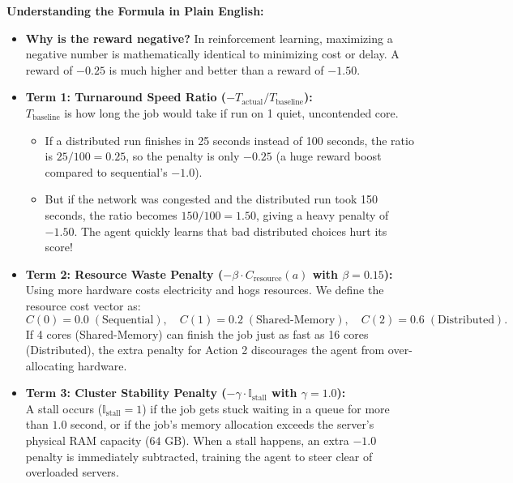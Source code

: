 \documentclass[11pt,a4paper]{article}
\begin{document}
\noindent \textbf{Understanding the Formula in Plain English:}
\begin{itemize}[noitemsep, topsep=2pt]
    \item \textbf{Why is the reward negative?} In reinforcement learning, maximizing a negative number is mathematically identical to minimizing cost or delay. A reward of $-0.25$ is much higher and better than a reward of $-1.50$.
    \item \textbf{Term 1: Turnaround Speed Ratio ($-T_{\text{actual}} / T_{\text{baseline}}$):}\\
    $T_{\text{baseline}}$ is how long the job would take if run on 1 quiet, uncontended core. 
    \begin{itemize}[noitemsep, topsep=1pt]
        \item If a distributed run finishes in 25 seconds instead of 100 seconds, the ratio is $25/100 = 0.25$, so the penalty is only $-0.25$ (a huge reward boost compared to sequential's $-1.0$).
        \item But if the network was congested and the distributed run took 150 seconds, the ratio becomes $150/100 = 1.50$, giving a heavy penalty of $-1.50$. The agent quickly learns that bad distributed choices hurt its score!
    \end{itemize}
    \item \textbf{Term 2: Resource Waste Penalty ($-\beta \cdot C_{\text{resource}}(a)$ with $\beta = 0.15$):}\\
    Using more hardware costs electricity and hogs resources. We define the resource cost vector as:
    \begin{equation*}
        C(0) = 0.0 \; (\text{Sequential}), \quad C(1) = 0.2 \; (\text{Shared-Memory}), \quad C(2) = 0.6 \; (\text{Distributed}).
    \end{equation*}
    If 4 cores (Shared-Memory) can finish the job just as fast as 16 cores (Distributed), the extra penalty for Action 2 discourages the agent from over-allocating hardware.
    \item \textbf{Term 3: Cluster Stability Penalty ($-\gamma \cdot \mathbb{I}_{\text{stall}}$ with $\gamma = 1.0$):}\\
    A stall occurs ($\mathbb{I}_{\text{stall}} = 1$) if the job gets stuck waiting in a queue for more than $1.0$ second, or if the job's memory allocation exceeds the server's physical RAM capacity ($64\text{ GB}$). When a stall happens, an extra $-1.0$ penalty is immediately subtracted, training the agent to steer clear of overloaded servers.
\end{itemize}
\end{document}
